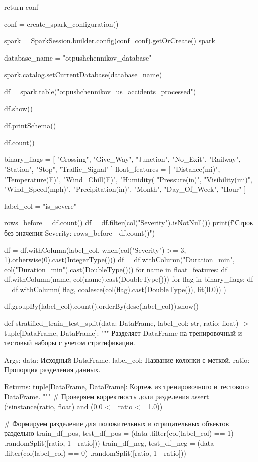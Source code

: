 \begin{code}
    return conf

conf = create_spark_configuration()

spark = SparkSession.builder.config(conf=conf).getOrCreate()
spark

database_name = "otpushchennikov_database"

spark.catalog.setCurrentDatabase(database_name)

df = spark.table("otpushchennikov_us_accidents_processed")

df.show()

df.printSchema()

df.count()

binary_flags = [
    "Crossing", "Give_Way", "Junction", "No_Exit",
    "Railway", "Station", "Stop", "Traffic_Signal"
]
float_features = [
    "Distance(mi)", "Temperature(F)", "Wind_Chill(F)", "Humidity(%
    "Pressure(in)", "Visibility(mi)", "Wind_Speed(mph)", "Precipitation(in)",
    "Month", "Day_Of_Week", "Hour"
]

label_col = "is_severe"

rows_before = df.count()
df = df.filter(col("Severity").isNotNull())
print(f"Строк без значения Severity: {rows_before - df.count()}")

df = df.withColumn(label_col,
                   when(col("Severity") >= 3, 1).otherwise(0).cast(IntegerType()))
df = df.withColumn("Duration_min", col("Duration_min").cast(DoubleType()))
for name in float_features:
    df = df.withColumn(name, col(name).cast(DoubleType()))
for flag in binary_flags:
    df = df.withColumn(
        flag,
        coalesce(col(flag).cast(DoubleType()), lit(0.0))
    )

df.groupBy(label_col).count().orderBy(desc(label_col)).show()

def stratified_train_test_split(data: DataFrame,
                                label_col: str,
                                ratio: float) -> tuple[DataFrame, DataFrame]:
    """
    Разделяет DataFrame на тренировочный и тестовый наборы с учетом стратификации.

    Args:
        data: Исходный DataFrame.
        label_col: Название колонки с меткой.
        ratio: Пропорция разделения данных.

    Returns:
        tuple[DataFrame, DataFrame]: Кортеж из тренировочного и тестового DataFrame.
    """
    # Проверяем корректность доли разделения
    assert (isinstance(ratio, float) and (0.0 <= ratio <= 1.0))

    # Формируем разделение для положительных и отрицательных объектов раздельно
    train_df_pos, test_df_pos = (data
                                 .filter(col(label_col) == 1)
                                 .randomSplit([ratio, 1 - ratio]))
    train_df_neg, test_df_neg = (data
                                 .filter(col(label_col) == 0)
                                 .randomSplit([ratio, 1 - ratio]))


\end{code}
